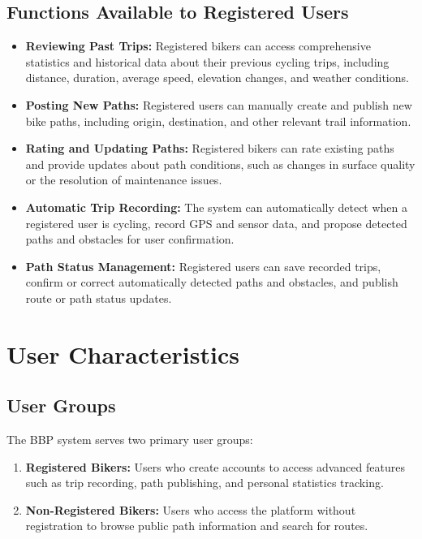 \subsection{Functions Available to Registered Users}
\label{subsec:functions_registered_users}%

\begin{itemize}
    \item \textbf{Reviewing Past Trips:} Registered bikers can access comprehensive statistics and historical data about their previous cycling trips, including distance, duration, average speed, elevation changes, and weather conditions.
    \item \textbf{Posting New Paths:} Registered users can manually create and publish new bike paths, including origin, destination, and other relevant trail information.
    \item \textbf{Rating and Updating Paths:} Registered bikers can rate existing paths and provide updates about path conditions, such as changes in surface quality or the resolution of maintenance issues.
    \item \textbf{Automatic Trip Recording:} The system can automatically detect when a registered user is cycling, record GPS and sensor data, and propose detected paths and obstacles for user confirmation.
    \item \textbf{Path Status Management:} Registered users can save recorded trips, confirm or correct automatically detected paths and obstacles, and publish route or path status updates.
\end{itemize}

\section{User Characteristics}
\label{sec:user_characteristics}%

\subsection{User Groups}
\label{subsec:user_groups}%

The BBP system serves two primary user groups:

\begin{enumerate}
    \item \textbf{Registered Bikers:} Users who create accounts to access advanced features such as trip recording, path publishing, and personal statistics tracking.
    \item \textbf{Non-Registered Bikers:} Users who access the platform without registration to browse public path information and search for routes.
\end{enumerate}

